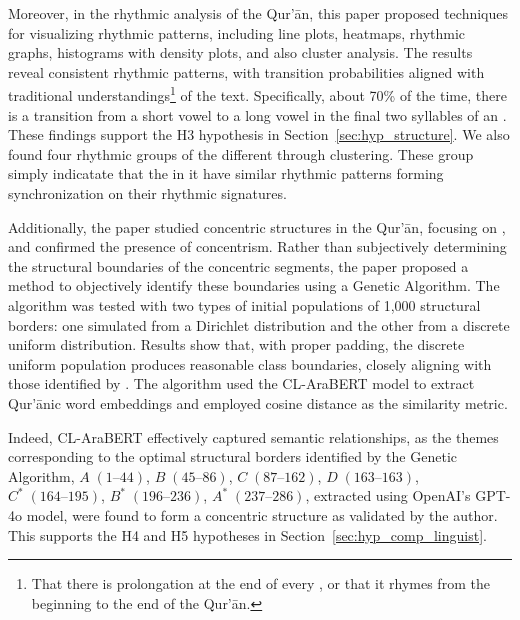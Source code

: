 Moreover, in the rhythmic analysis of the Qur'\=an, this paper proposed techniques for visualizing rhythmic patterns, including line plots, heatmaps, rhythmic graphs, histograms with density plots, and also cluster analysis. The results reveal consistent rhythmic patterns, with transition probabilities aligned with traditional understandings\footnote{That there is prolongation at the end of every  , or that it rhymes from the beginning to the end of the Qur'\=an.} of the text. Specifically, about 70\% of the time, there is a transition from a short vowel to a long vowel in the final two syllables of an  . These findings support the H3 hypothesis in Section~\ref{sec:hyp_structure}. We also found four rhythmic groups of the different   through clustering. These group simply indicatate that the   in it have similar rhythmic patterns forming synchronization on their rhythmic signatures.

Additionally, the paper studied concentric structures in the Qur'\=an, focusing on  , and confirmed the presence of concentrism. Rather than subjectively determining the structural boundaries of the concentric segments, the paper proposed a method to objectively identify these boundaries using a Genetic Algorithm. The algorithm was tested with two types of initial populations of 1{,}000 structural borders: one simulated from a Dirichlet distribution and the other from a discrete uniform distribution. Results show that, with proper padding, the discrete uniform population produces reasonable class boundaries, closely aligning with those identified by . The algorithm used the CL-AraBERT model to extract Qur'\=anic word embeddings and employed cosine distance as the similarity metric.

Indeed, CL-AraBERT effectively captured semantic relationships, as the themes corresponding to the optimal structural borders identified by the Genetic Algorithm, $A\;(1\text{--}44)$, $B\;(45\text{--}86)$, $C\;(87\text{--}162)$, $D\;(163\text{--}163)$, $C^*\;(164\text{--}195)$, $B^*\;(196\text{--}236)$, $A^*\;(237\text{--}286)$, extracted using OpenAI's GPT-4o model, were found to form a concentric structure as validated by the author. This supports the H4 and H5 hypotheses in Section~\ref{sec:hyp_comp_linguist}.

